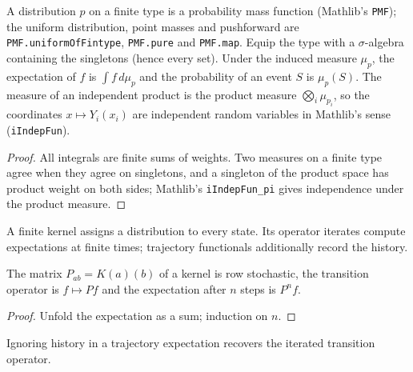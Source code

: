 \begin{lemma}\label{lem:bridge-pmf}
\leanok{}
A distribution $p$ on a finite type is a probability mass function (Mathlib's \texttt{PMF}); the
uniform distribution, point masses and pushforward are \texttt{PMF.uniformOfFintype},
\texttt{PMF.pure} and \texttt{PMF.map}. Equip the type with a $\sigma$-algebra containing the
singletons (hence every set). Under the induced measure $\mu_p$, the expectation of $f$ is
$\int f\,d\mu_p$ and the probability of an event $S$ is $\mu_p(S)$. The measure of an independent
product is the product measure $\bigotimes_i\mu_{p_i}$, so the coordinates
$x\mapsto Y_i(x_i)$ are independent random variables in Mathlib's sense (\texttt{iIndepFun}).
\end{lemma}
\begin{proof}\leanok
All integrals are finite sums of weights. Two measures on a finite type agree when they agree on
singletons, and a singleton of the product space has product weight on both sides; Mathlib's
\texttt{iIndepFun\_pi} gives independence under the product measure.
\end{proof}
\begin{definition}\label{def:kernel}
\leanok{}
A finite kernel assigns a distribution to every state. Its operator iterates
compute expectations at finite times; trajectory functionals additionally
record the history.
\end{definition}
\begin{lemma}\label{lem:kernel-matrix}
\leanok{}
The matrix $P_{ab}=K(a)(b)$ of a kernel is row stochastic, the transition operator is $f\mapsto Pf$
and the expectation after $n$ steps is $P^nf$.
\end{lemma}
\begin{proof}\leanok
Unfold the expectation as a sum; induction on $n$.
\end{proof}
\begin{lemma}\label{lem:endpoint}
\leanok{}
Ignoring history in a trajectory expectation recovers the iterated transition operator.
\end{lemma}

